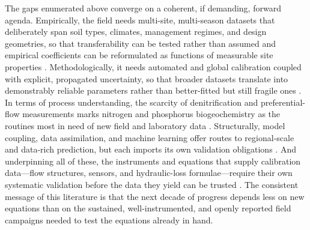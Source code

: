 The gaps enumerated above converge on a coherent, if demanding, forward agenda. Empirically, the field needs multi-site, multi-season datasets that deliberately span soil types, climates, management regimes, and design geometries, so that transferability can be tested rather than assumed and empirical coefficients can be reformulated as functions of measurable site properties \parencite{Li2006,Chelil2022}. Methodologically, it needs automated and global calibration coupled with explicit, propagated uncertainty, so that broader datasets translate into demonstrably reliable parameters rather than better-fitted but still fragile ones \parencite{Warsta2014,Timalsina2023,Alzraiee2013b}. In terms of process understanding, the scarcity of denitrification and preferential-flow measurements marks nitrogen and phosphorus biogeochemistry as the routines most in need of new field and laboratory data \parencite{David2009,Salazar2011}. Structurally, model coupling, data assimilation, and machine learning offer routes to regional-scale and data-rich prediction, but each imports its own validation obligations \parencite{Apostel2021,Song2021}. And underpinning all of these, the instruments and equations that supply calibration data---flow structures, sensors, and hydraulic-loss formulae---require their own systematic validation before the data they yield can be trusted \parencite{Christianson2019,Bayat2011}. The consistent message of this literature is that the next decade of progress depends less on new equations than on the sustained, well-instrumented, and openly reported field campaigns needed to test the equations already in hand.